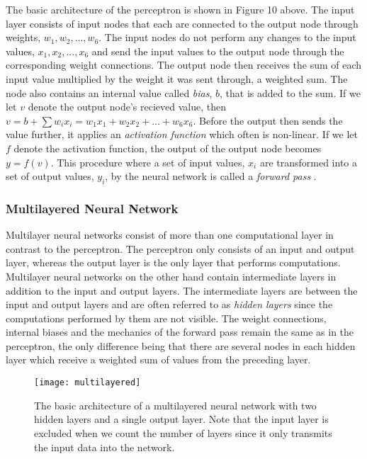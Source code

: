 \documentclass[titlepage]{article}
\begin{document}
\vskip 0.1cm

\noindent
The basic architecture of the perceptron is shown in Figure 10 above. The input layer consists of input nodes that each are connected to the output node through weights, $w_{1}, w_{2}, ..., w_{6}$. The input nodes do not perform any changes to the input values, $x_{1}, x_{2}, ..., x_{6}$ and send the input values to the output node through the corresponding weight connections. The output node then receives the sum of each input value multiplied by the weight it was sent through, a weighted sum. The node also contains an internal value called \emph{bias}, $b$, that is added to the sum. If we let $v$ denote the output node's recieved value, then $v = b + \sum w_{i} x_{i} = w_{1} x_{1} + w_{2} x_{2} + ... + w_{6} x_{6}$. Before the output then sends the value further, it applies an \emph{activation function} which often is non-linear. If we let $f$ denote the activation function, the output of the output node becomes $y = f(v)$. This procedure where a set of input values, $x_{i}$ are transformed into a set of output values, $y_{i}$, by the neural network is called a \emph{forward pass} \cite{charu}.

\subsubsection{Multilayered Neural Network}

\vskip 0.2cm

Multilayer neural networks consist of more than one computational layer \cite{charu} in contrast to the perceptron. The perceptron only consists of an input and output layer, whereas the output layer is the only layer that performs computations. Multilayer neural networks on the other hand contain intermediate layers in addition to the input and output layers. The intermediate layers are between the input and output layers and are often referred to as \emph{hidden layers} since the computations performed by them are not visible. The weight connections, internal biases and the mechanics of the forward pass remain the same as in the perceptron, the only difference being that there are several nodes in each hidden layer which receive a weighted sum of values from the preceding layer.

\newpage

\begin{figure}[h]
    \centering
    \texttt{[image: multilayered]}
    \vskip 0.2cm
    \caption{The basic architecture of a multilayered neural network with two hidden layers and a single output layer. Note that the input layer is excluded when we count the number of layers since it only transmits the input data into the network. }
\end{figure}
\end{document}
